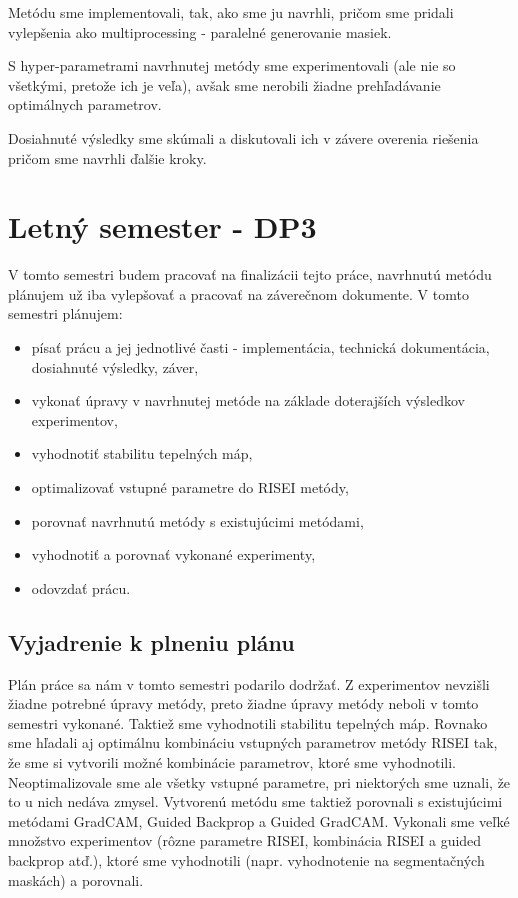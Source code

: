     Metódu sme implementovali, tak, ako sme ju navrhli, pričom sme pridali vylepšenia ako multiprocessing - paralelné generovanie masiek.

    S hyper-parametrami navrhnutej metódy sme experimentovali (ale nie so všetkými, pretože ich je veľa), avšak sme nerobili žiadne prehľadávanie optimálnych parametrov.

    Dosiahnuté výsledky sme skúmali a diskutovali ich v závere overenia riešenia pričom sme navrhli ďalšie kroky.


\section{Letný semester - DP3}

    
    V tomto semestri budem pracovať na finalizácii tejto práce, navrhnutú metódu plánujem už iba vylepšovať a pracovať na záverečnom dokumente. V tomto semestri plánujem:
    
    \begin{itemize}
        \item písať prácu a jej jednotlivé časti - implementácia, technická dokumentácia, dosiahnuté výsledky, záver,
        \item vykonať úpravy v navrhnutej metóde na základe doterajších výsledkov experimentov,
        \item vyhodnotiť stabilitu tepelných máp,
        \item optimalizovať vstupné parametre do RISEI metódy,
        \item porovnať navrhnutú metódy s existujúcimi metódami,
        \item vyhodnotiť a porovnať vykonané experimenty,
        \item odovzdať prácu.
    \end{itemize}
    
    \subsection{Vyjadrenie k plneniu plánu}
    
    Plán práce sa nám v tomto semestri podarilo dodržať.
    Z experimentov nevzišli žiadne potrebné úpravy metódy, preto žiadne úpravy metódy neboli v tomto semestri vykonané. Taktiež sme vyhodnotili stabilitu tepelných máp. Rovnako sme hľadali aj optimálnu kombináciu vstupných parametrov metódy RISEI tak, že sme si vytvorili možné kombinácie parametrov, ktoré sme vyhodnotili. Neoptimalizovale sme ale všetky vstupné parametre, pri niektorých sme uznali, že to u nich nedáva zmysel. Vytvorenú metódu sme taktiež porovnali s existujúcimi metódami GradCAM, Guided Backprop a Guided GradCAM. Vykonali sme veľké množstvo experimentov (rôzne parametre RISEI, kombinácia RISEI a guided backprop atď.), ktoré sme vyhodnotili (napr. vyhodnotenie na segmentačných maskách) a porovnali.
